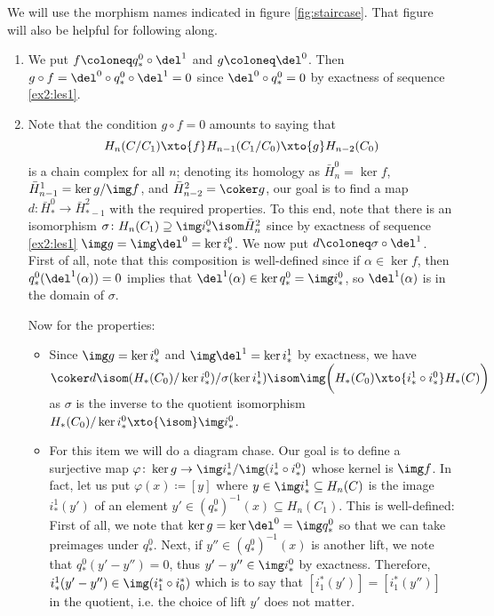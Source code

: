 \begin{solution}
	We will use the morphism names indicated in figure \ref{fig:staircase}.
	That figure will also be helpful for following along.
	\begin{enumerate}
		\item We put $f \coloneq q^0_* \circ \del^1$ and $g \coloneq \del^0$.
			Then $g \circ f = \del^0 \circ q^0_* \circ \del^1 = 0$ since $\del^0 \circ q^0_* = 0$ by exactness of sequence \eqref{ex2:les1}.
		\item Note that the condition $g \circ f = 0$ amounts to saying that
			\begin{equation*}
				H_n(C / C_1) \xto{f} H_{n - 1}(C_1 / C_0) \xto{g} H_{n - 2}(C_0)
			\end{equation*}
			is a chain complex for all $n$; denoting its homology as $\bar{H}^0_n = \ker f$, $\bar{H}^1_{n - 1} = \ker g / \img f$, and $\bar{H}^2_{n - 2} = \coker g$, our goal is to find a map $d\colon \bar{H}^0_* \to \bar{H}^2_{* - 1}$ with the required properties.
			To this end, note that there is an isomorphism $\sigma\colon H_n(C_1) \supseteq \img i^0_* \isom \bar{H}^2_n$ since by exactness of sequence \eqref{ex2:les1} $\img g = \img \del^0 = \ker i^0_*$.
			We now put $d \coloneq \sigma \circ \del^1$.
			First of all, note that this composition is well-defined since if $\alpha \in \ker f$, then $q^0_*(\del^1(\alpha)) = 0$ implies that $\del^1(\alpha) \in \ker q^0_* = \img i^0_*$, so $\del^1(\alpha)$ is in the domain of $\sigma$.

			Now for the properties:
			\begin{itemize}
				\item Since $\img g = \ker i^0_*$ and $\img \del^1 = \ker i^1_*$ by exactness, we have $\coker d \isom (H_*(C_0) / \ker i^0_*) / \sigma(\ker i^1_*) \isom \img\bigg(H_*(C_0) \xto{i^1_* \circ i^0_*} H_*(C)\bigg)$ as $\sigma$ is the inverse to the quotient isomorphism $H_*(C_0) / \ker i^0_* \xto{\isom} \img i^0_*$. 
				\item For this item we will do a diagram chase.
					Our goal is to define a surjective map $\varphi\colon \ker g \to \img i^1_* / \img (i^1_* \circ i^0_*)$ whose kernel is $\img f$.
					In fact, let us put $\varphi(x) \coloneq [y]$ where $y \in \img i^1_* \subseteq H_n(C)$ is the image $i^1_*(y')$ of an element $y' \in (q^0_*)^{-1}(x) \subseteq H_n(C_1)$.
					This is well-defined: 
					First of all, we note that $\ker g = \ker \del^0 = \img q^0_*$ so that we can take preimages under $q^0_*$.
					Next, if $y'' \in (q^0_*)^{-1}(x)$ is another lift, we note that $q^0_*(y' - y'') = 0$, thus $y' - y'' \in \img i^0_*$ by exactness. 
					Therefore, $i^1_*(y' - y'') \in \img (i_1^* \circ i_0^*)$ which is to say that $[i_1^*(y')] = [i_1^*(y'')]$ in the quotient, i.e. the choice of lift $y'$ does not matter.


\end{itemize}
\end{enumerate}
\end{solution}
